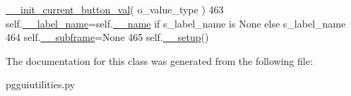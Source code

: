 \begin{DoxyCode}
      \hyperlink{classnegui_1_1pgguiutilities_1_1KeyCategoricalValueFrame_ab1e309b3e63c5c4a57d37d2a61f4e90d}{\_\_init\_current\_button\_val}( o\_value\_type )
463         self.\hyperlink{classnegui_1_1pgguiutilities_1_1KeyCategoricalValueFrame_a3a453ac47871c2f8b894442fd3ef5d07}{\_\_label\_name}=self.\hyperlink{classnegui_1_1pgguiutilities_1_1KeyCategoricalValueFrame_a92a1947d6110ada3bd813cc8e84d84ad}{\_\_name} \textcolor{keywordflow}{if} s\_label\_name \textcolor{keywordflow}{is} \textcolor{keywordtype}{None} \textcolor{keywordflow}{else} s\_label\_name
464         self.\hyperlink{classnegui_1_1pgguiutilities_1_1KeyCategoricalValueFrame_ad2350dd7438d98d077c86e8295425ca0}{\_\_subframe}=\textcolor{keywordtype}{None}
465         self.\hyperlink{classnegui_1_1pgguiutilities_1_1KeyCategoricalValueFrame_a1e890256208ab06e21db468c7aed6bd8}{\_\_setup}()
\end{DoxyCode}


The documentation for this class was generated from the following file\+:\begin{DoxyCompactItemize}
\item 
pgguiutilities.\+py\end{DoxyCompactItemize}
